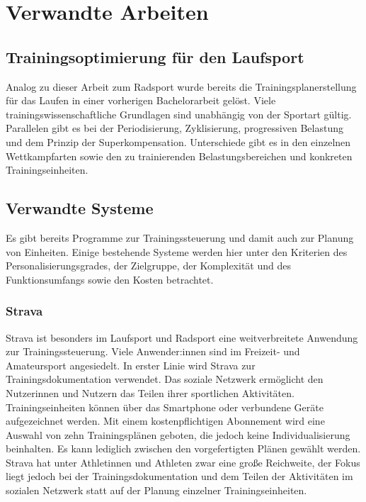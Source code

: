 \chapter{Verwandte Arbeiten}
\label{sec:verwandt}

\section{Trainingsoptimierung für den Laufsport}
\label{sec:verwandt:sec1}
Analog zu dieser Arbeit zum Radsport wurde bereits die Trainingsplanerstellung für das Laufen in einer vorherigen Bachelorarbeit \cite{BALaufen} gelöst. 
Viele trainingswissenschaftliche Grundlagen sind unabhängig von der Sportart gültig. Parallelen gibt es bei der Periodisierung, Zyklisierung, progressiven Belastung und dem Prinzip der Superkompensation. Unterschiede gibt es in den einzelnen Wettkampfarten sowie den zu trainierenden Belastungsbereichen und konkreten Trainingseinheiten.

\section{Verwandte Systeme}
Es gibt bereits Programme zur Trainingssteuerung und damit auch zur Planung von Einheiten. Einige bestehende Systeme werden hier unter den Kriterien des Personalisierungsgrades, der Zielgruppe, der Komplexität und des Funktionsumfangs sowie den Kosten betrachtet.

\subsection{Strava}
Strava \cite{StravaWeb} ist besonders im Laufsport und Radsport eine weitverbreitete Anwendung zur Trainingssteuerung. Viele Anwender:innen sind im Freizeit- und Amateursport angesiedelt. In erster Linie wird Strava zur Trainingsdokumentation verwendet. Das soziale Netzwerk ermöglicht den Nutzerinnen und  Nutzern das Teilen ihrer sportlichen Aktivitäten. Trainingseinheiten können über das Smartphone oder verbundene Geräte aufgezeichnet werden. Mit einem kostenpflichtigen Abonnement wird eine Auswahl von zehn Trainingsplänen geboten, die jedoch keine Individualisierung beinhalten. Es kann lediglich zwischen den vorgefertigten Plänen gewählt werden. Strava hat unter Athletinnen und Athleten zwar eine große Reichweite, der Fokus liegt jedoch bei der Trainingsdokumentation und dem Teilen der Aktivitäten im sozialen Netzwerk statt auf der Planung einzelner Trainingseinheiten.

